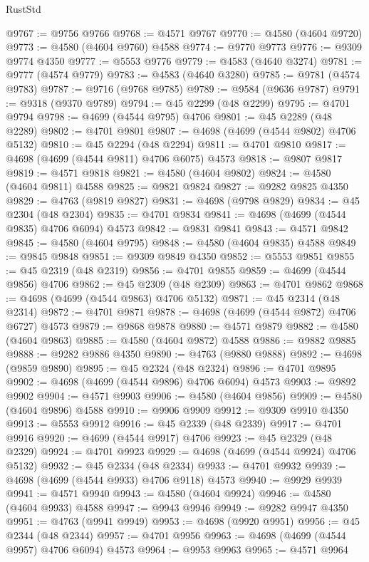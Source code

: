 \begin{lexlean}{RustStd}
\begin{coremodule}
@9767 := @9756 @9766
@9768 := @4571 @9767
@9770 := @4580 (@4604 @9720)
@9773 := @4580 (@4604 @9760) @4588
@9774 := @9770 @9773
@9776 := @9309 @9774 @4350
@9777 := @5553 @9776
@9779 := @4583 (@4640 @3274)
@9781 := @9777 (@4574 @9779)
@9783 := @4583 (@4640 @3280)
@9785 := @9781 (@4574 @9783)
@9787 := @9716 (@9768 @9785)
@9789 := @9584 (@9636 @9787)
@9791 := @9318 (@9370 @9789)
@9794 := @45 @2299 (@48 @2299)
@9795 := @4701 @9794
@9798 := @4699 (@4544 @9795) @4706
@9801 := @45 @2289 (@48 @2289)
@9802 := @4701 @9801
@9807 := @4698 (@4699 (@4544 @9802) @4706 @5132)
@9810 := @45 @2294 (@48 @2294)
@9811 := @4701 @9810
@9817 := @4698 (@4699 (@4544 @9811) @4706 @6075) @4573
@9818 := @9807 @9817
@9819 := @4571 @9818
@9821 := @4580 (@4604 @9802)
@9824 := @4580 (@4604 @9811) @4588
@9825 := @9821 @9824
@9827 := @9282 @9825 @4350
@9829 := @4763 (@9819 @9827)
@9831 := @4698 (@9798 @9829)
@9834 := @45 @2304 (@48 @2304)
@9835 := @4701 @9834
@9841 := @4698 (@4699 (@4544 @9835) @4706 @6094) @4573
@9842 := @9831 @9841
@9843 := @4571 @9842
@9845 := @4580 (@4604 @9795)
@9848 := @4580 (@4604 @9835) @4588
@9849 := @9845 @9848
@9851 := @9309 @9849 @4350
@9852 := @5553 @9851
@9855 := @45 @2319 (@48 @2319)
@9856 := @4701 @9855
@9859 := @4699 (@4544 @9856) @4706
@9862 := @45 @2309 (@48 @2309)
@9863 := @4701 @9862
@9868 := @4698 (@4699 (@4544 @9863) @4706 @5132)
@9871 := @45 @2314 (@48 @2314)
@9872 := @4701 @9871
@9878 := @4698 (@4699 (@4544 @9872) @4706 @6727) @4573
@9879 := @9868 @9878
@9880 := @4571 @9879
@9882 := @4580 (@4604 @9863)
@9885 := @4580 (@4604 @9872) @4588
@9886 := @9882 @9885
@9888 := @9282 @9886 @4350
@9890 := @4763 (@9880 @9888)
@9892 := @4698 (@9859 @9890)
@9895 := @45 @2324 (@48 @2324)
@9896 := @4701 @9895
@9902 := @4698 (@4699 (@4544 @9896) @4706 @6094) @4573
@9903 := @9892 @9902
@9904 := @4571 @9903
@9906 := @4580 (@4604 @9856)
@9909 := @4580 (@4604 @9896) @4588
@9910 := @9906 @9909
@9912 := @9309 @9910 @4350
@9913 := @5553 @9912
@9916 := @45 @2339 (@48 @2339)
@9917 := @4701 @9916
@9920 := @4699 (@4544 @9917) @4706
@9923 := @45 @2329 (@48 @2329)
@9924 := @4701 @9923
@9929 := @4698 (@4699 (@4544 @9924) @4706 @5132)
@9932 := @45 @2334 (@48 @2334)
@9933 := @4701 @9932
@9939 := @4698 (@4699 (@4544 @9933) @4706 @9118) @4573
@9940 := @9929 @9939
@9941 := @4571 @9940
@9943 := @4580 (@4604 @9924)
@9946 := @4580 (@4604 @9933) @4588
@9947 := @9943 @9946
@9949 := @9282 @9947 @4350
@9951 := @4763 (@9941 @9949)
@9953 := @4698 (@9920 @9951)
@9956 := @45 @2344 (@48 @2344)
@9957 := @4701 @9956
@9963 := @4698 (@4699 (@4544 @9957) @4706 @6094) @4573
@9964 := @9953 @9963
@9965 := @4571 @9964

\end{coremodule}
\end{lexlean}
